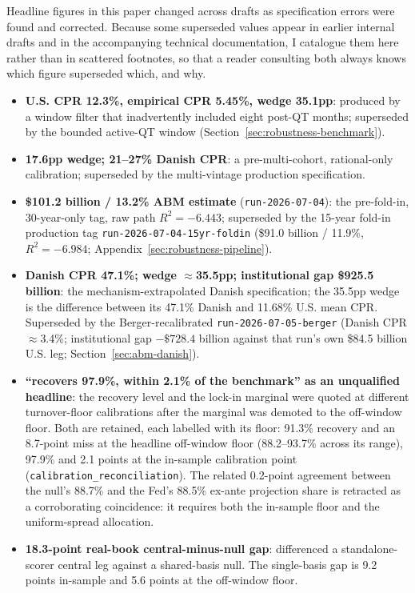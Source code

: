 \documentclass[12pt]{article}
\begin{document}
Headline figures in this paper changed across drafts as specification errors were found and corrected. Because some superseded values appear in earlier internal drafts and in the accompanying technical documentation, I catalogue them here rather than in scattered footnotes, so that a reader consulting both always knows which figure superseded which, and why.

\begingroup\sloppy
\begin{itemize}
\item \textbf{U.S. CPR 12.3\%, empirical CPR 5.45\%, wedge 35.1pp}: produced by a window filter that inadvertently included eight post-QT months; superseded by the bounded active-QT window (Section~\ref{sec:robustness-benchmark}).
\item \textbf{17.6pp wedge; 21--27\% Danish CPR}: a pre-multi-cohort, rational-only calibration; superseded by the multi-vintage production specification.
\item \textbf{\$101.2 billion / 13.2\% ABM estimate} (\texttt{run-2026-07-04}): the pre-fold-in, 30-year-only tag, raw path $R^2 = -6.443$; superseded by the 15-year fold-in production tag \texttt{run-2026-07-04-15yr-foldin} (\$91.0 billion / 11.9\%, $R^2 = -6.984$; Appendix~\ref{sec:robustness-pipeline}).
\item \textbf{Danish CPR 47.1\%; wedge $\approx$35.5pp; institutional gap \$925.5 billion}: the mechanism-extrapolated Danish specification; the 35.5pp wedge is the difference between its 47.1\% Danish and 11.68\% U.S. mean CPR. Superseded by the Berger-recalibrated \texttt{run-2026-07-05-berger} (Danish CPR $\approx$3.4\%; institutional gap $-\$728.4$ billion against that run's own \$84.5 billion U.S. leg; Section~\ref{sec:abm-danish}).
\item \textbf{``recovers 97.9\%, within 2.1\% of the benchmark'' as an unqualified headline}: the recovery level and the lock-in marginal were quoted at different turnover-floor calibrations after the marginal was demoted to the off-window floor. Both are retained, each labelled with its floor: 91.3\% recovery and an 8.7-point miss at the headline off-window floor (88.2--93.7\% across its range), 97.9\% and 2.1 points at the in-sample calibration point (\texttt{calibration\_reconciliation}). The related 0.2-point agreement between the null's 88.7\% and the Fed's 88.5\% ex-ante projection share is retracted as a corroborating coincidence: it requires both the in-sample floor and the uniform-spread allocation.

\item \textbf{18.3-point real-book central-minus-null gap}: differenced a standalone-scorer central leg against a shared-basis null. The single-basis gap is 9.2 points in-sample and 5.6 points at the off-window floor.


\end{itemize}
\end{document}
